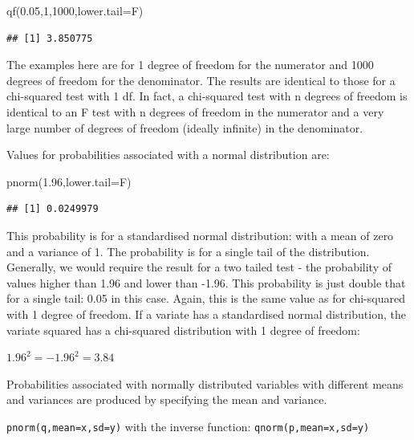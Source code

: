 \documentclass[
]{book}
\newenvironment{Shaded}{\begin{snugshade}}{\end{snugshade}}
\newcommand{\AttributeTok}[1]{\textcolor[rgb]{0.77,0.63,0.00}{#1}}
\newcommand{\DecValTok}[1]{\textcolor[rgb]{0.00,0.00,0.81}{#1}}
\newcommand{\FloatTok}[1]{\textcolor[rgb]{0.00,0.00,0.81}{#1}}
\newcommand{\FunctionTok}[1]{\textcolor[rgb]{0.00,0.00,0.00}{#1}}
\newcommand{\NormalTok}[1]{#1}
\begin{document}
\begin{Shaded}
\begin{Highlighting}[]
\FunctionTok{qf}\NormalTok{(}\FloatTok{0.05}\NormalTok{,}\DecValTok{1}\NormalTok{,}\DecValTok{1000}\NormalTok{,}\AttributeTok{lower.tail=}\NormalTok{F)}
\end{Highlighting}
\end{Shaded}

\begin{verbatim}
## [1] 3.850775
\end{verbatim}

The examples here are for 1 degree of freedom for the numerator and 1000 degrees of freedom for the denominator. The results are identical to those for a chi-squared test with 1 df. In fact, a chi-squared test with n degrees of freedom is identical to an F test with n degrees of freedom in the numerator and a very large number of degrees of freedom (ideally infinite) in the denominator.

Values for probabilities associated with a normal distribution are:

\begin{Shaded}
\begin{Highlighting}[]
\FunctionTok{pnorm}\NormalTok{(}\FloatTok{1.96}\NormalTok{,}\AttributeTok{lower.tail=}\NormalTok{F)}
\end{Highlighting}
\end{Shaded}

\begin{verbatim}
## [1] 0.0249979
\end{verbatim}

This probability is for a standardised normal distribution: with a mean of zero and a variance of 1. The probability is for a single tail of the distribution. Generally, we would require the result for a two tailed test - the probability of values higher than 1.96 and lower than -1.96. This probability is just double that for a single tail: 0.05 in this case. Again, this is the same value as for chi-squared with 1 degree of freedom. If a variate has a standardised normal distribution, the variate squared has a chi-squared distribution with 1 degree of freedom:

\(1.96^2 = -1.96^2 = 3.84\)

Probabilities associated with normally distributed variables with different means and variances are produced by specifying the mean and variance.

\texttt{pnorm(q,mean=x,sd=y)} with the inverse function: \texttt{qnorm(p,mean=x,sd=y)}
\end{document}
